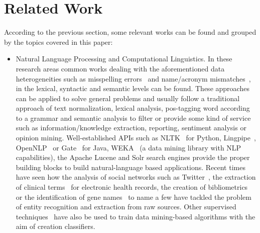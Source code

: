 \documentclass[1p,12pt]{elsarticle}
\begin{document}
\section{Related Work}
According to the previous section, some relevant works can be found and grouped by the topics covered in this paper:
\begin{itemize}
 \item Natural Language Processing and Computational Linguistics. In these research areas common works dealing with the aforementioned data heterogeneities 
   such as misspelling errors~\citep{NorvigSpelling,StanfordSpelling} and name/acronym mismatches~\citep{Yeates99automaticextraction,Ratinov:2004:AES:1025132.1026366}, 
  in the lexical, syntactic and semantic levels can be found. These approaches can be applied to solve general problems and usually follow a 
  traditional approach of text normalization, lexical analysis, pos-tagging word according to a grammar and semantic analysis to filter or 
  provide some kind of service such as information/knowledge extraction, reporting, sentiment analysis or opinion mining. 
  Well-established APIs such as NLTK~\citep{LoperBird02} for Python, Lingpipe~\citep{Lingpipe}, OpenNLP~\citep{OpenNLP} or Gate~\citep{Gate} for Java, WEKA~\citep{read12:_scalab} 
  (a data mining library with NLP capabilities), the Apache Lucene and Solr search engines provide the proper building blocks to build natural-language based applications. 
  Recent times have seen how the analysis of social networks such as Twitter~\citep{Li:2012:TNE:2348283.2348380,Gimpel:2011:PTT:2002736.2002747,Kontopoulos20134065}, the extraction of 
  clinical terms~\citep{Wang:2009:ARN:1667884.1667888,Nam20143005} for electronic health records, the creation of bibliometrics~\citep{Galvez2006,Morillo:2013:TAA:2424697.2424727} or 
  the identification of gene names~\citep{Krauthammer:2004:TIB:1053007.1053018,Galvez2012} to name a few have tackled the problem of entity recognition and extraction from raw sources. 
  Other supervised techniques~\citep{Bohn:2006:PHD} have also be used to train data mining-based algorithms with the aim of creation classifiers.
 

\end{itemize}
\end{document}
